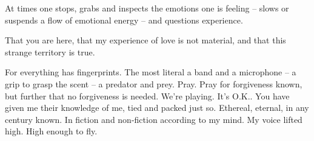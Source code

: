 

At times one stops, grabs and inspects the emotions one is feeling --
slows or suspends a flow of emotional energy -- and questions
experience.

That you are here, that my experience of love is not material, and
that this strange territory is true.

For everything has fingerprints.  The most literal a band and a
microphone -- a grip to grasp the scent -- a predator and prey.  Pray.
Pray for forgiveness known, but further that no forgiveness is needed.
We're playing.  It's O.K..  You have given me their knowledge of me,
tied and packed just so.  Ethereal, eternal, in any century known.  In
fiction and non-fiction according to my mind.  My voice lifted high.
High enough to fly.


\bye
